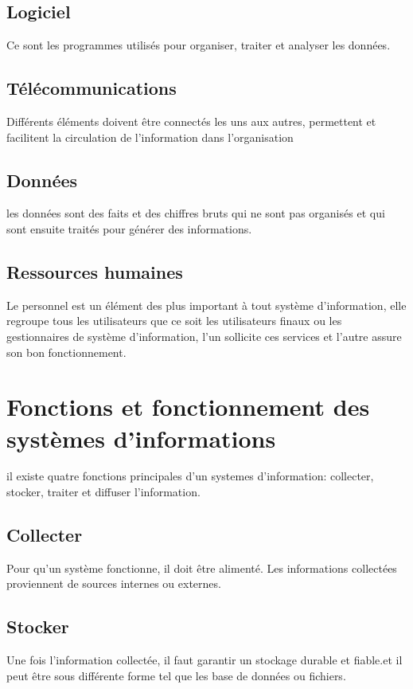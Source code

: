 \subsection{Logiciel }
\par Ce sont les programmes utilisés pour organiser, traiter et analyser les données.
      
\subsection{Télécommunications }
\par Différents éléments doivent être connectés les uns aux autres, permettent et facilitent la circulation de l’information dans l’organisation
     
\subsection{Données }
\par les données sont des faits et des chiffres bruts qui ne sont pas organisés et qui sont ensuite traités pour générer des informations.
     
\subsection{Ressources humaines }
\par Le personnel est un élément des plus important à tout système d’information, elle regroupe tous les utilisateurs que ce soit les utilisateurs finaux ou les gestionnaires de système d’information, l’un sollicite ces services et l’autre assure son bon fonctionnement.

\section{Fonctions et fonctionnement des systèmes d’informations }
\par il existe quatre fonctions principales d'un systemes d'information: collecter, stocker, traiter et diffuser l’information.

\subsection{Collecter }
\par Pour qu'un système fonctionne, il doit être alimenté. Les informations collectées proviennent de sources internes ou externes. 
    
\subsection{Stocker }
\par Une fois l’information collectée, il faut garantir un stockage durable et fiable.et il peut être sous différente forme tel que les base de données ou fichiers.

